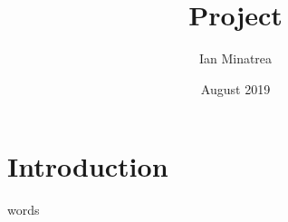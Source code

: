 \documentclass{article}
\title{Project}
\author{Ian Minatrea}
\date{August 2019}
\begin{document}
\maketitle

\section{Introduction}
words
\end{document}
